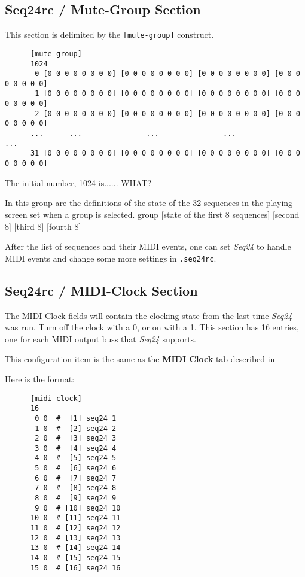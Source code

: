 \subsection{Seq24rc / Mute-Group Section}
\label{subsec:seq24_rc_file_mute_group}
     
   This section is delimited by the \texttt{[mute-group]} construct.

   \begin{verbatim}
      [mute-group]
      1024
       0 [0 0 0 0 0 0 0 0] [0 0 0 0 0 0 0 0] [0 0 0 0 0 0 0 0] [0 0 0 0 0 0 0 0]
       1 [0 0 0 0 0 0 0 0] [0 0 0 0 0 0 0 0] [0 0 0 0 0 0 0 0] [0 0 0 0 0 0 0 0]
       2 [0 0 0 0 0 0 0 0] [0 0 0 0 0 0 0 0] [0 0 0 0 0 0 0 0] [0 0 0 0 0 0 0 0]
      ...      ...               ...               ...               ...
      31 [0 0 0 0 0 0 0 0] [0 0 0 0 0 0 0 0] [0 0 0 0 0 0 0 0] [0 0 0 0 0 0 0 0]
   \end{verbatim}

   The initial number, 1024 is...... WHAT?

   In this group are the definitions of the state of the 32 sequences
   in the playing screen set when a group is selected.
   group [state of the first 8 sequences] [second 8] [third 8] [fourth 8]

   After the list of sequences and their MIDI events, one can 
   set \textsl{Seq24} to handle MIDI events and change some more settings
   in \texttt{.seq24rc}.

\subsection{Seq24rc / MIDI-Clock Section}
\label{subsec:seq24_rc_file_midi_clock}

   The MIDI Clock fields will contain the clocking state from the last 
   time \textsl{Seq24} was run.  Turn off the clock with a 0, or on with a 1.
   This section has 16 entries, one for each MIDI output buss that
   \textsl{Seq24} supports.

   This configuration item is the same as the 
   \textbf{MIDI Clock} tab described in
   
   Here is the format:

   \begin{verbatim}
      [midi-clock]
      16
       0 0  #  [1] seq24 1
       1 0  #  [2] seq24 2
       2 0  #  [3] seq24 3
       3 0  #  [4] seq24 4
       4 0  #  [5] seq24 5
       5 0  #  [6] seq24 6
       6 0  #  [7] seq24 7
       7 0  #  [8] seq24 8
       8 0  #  [9] seq24 9
       9 0  # [10] seq24 10
      10 0  # [11] seq24 11
      11 0  # [12] seq24 12
      12 0  # [13] seq24 13
      13 0  # [14] seq24 14
      14 0  # [15] seq24 15
      15 0  # [16] seq24 16
   \end{verbatim}

